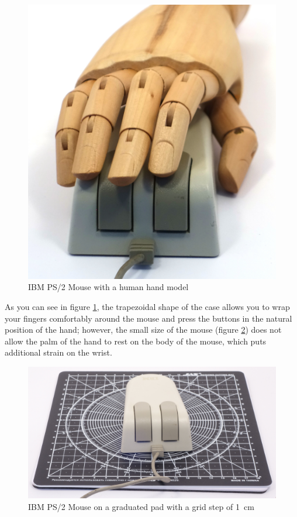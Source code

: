 \documentclass[11pt, a4paper]{article}
\begin{document}
\begin{figure}[h]
    \centering
    \includegraphics[scale=0.4]{1987_ibm_ps2_mouse/num3.JPG}
    \caption{IBM PS/2 Mouse with a human hand model}
    \label{fig:IMBPS2Hand}
\end{figure}

As you can see in figure \ref{fig:IMBPS2Hand}, the trapezoidal shape of the case allows you to wrap your fingers comfortably around the mouse and press the buttons in the natural position of the hand; however, the small size of the mouse (figure \ref{fig:IBMPS2Size}) does not allow the palm of the hand to rest on the body of the mouse, which puts additional strain on the wrist.

\begin{figure}[h]
    \centering
    \includegraphics[scale=0.34]{1987_ibm_ps2_mouse/num4.jpg}
    \caption{IBM PS/2 Mouse on a graduated pad with a grid step of 1~cm}
    \label{fig:IBMPS2Size}
\end{figure}
\end{document}
